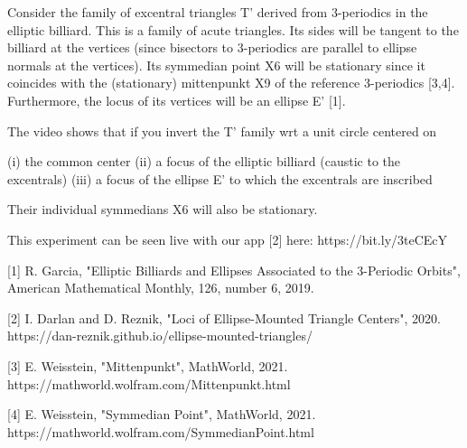 Consider the family of excentral triangles T' derived from 3-periodics in the elliptic billiard. This is a family of acute triangles. Its sides will be tangent to the billiard at the vertices (since bisectors to 3-periodics are parallel to ellipse normals at the vertices). Its symmedian point X6 will be stationary since it coincides with the (stationary) mittenpunkt X9 of the reference 3-periodics [3,4]. Furthermore, the locus of its vertices will be an ellipse E' [1].

The video shows that if you invert the T' family wrt a unit circle centered on

(i) the common center
(ii) a focus of the elliptic billiard (caustic to the excentrals)
(iii) a focus of the ellipse E' to which the excentrals are inscribed

Their individual symmedians X6 will also be stationary.

This experiment can be seen live with our app [2] here: https://bit.ly/3teCEcY

[1] R. Garcia, "Elliptic Billiards and Ellipses Associated to the 3-Periodic Orbits", American Mathematical Monthly, 126, number 6, 2019.

[2] I. Darlan and D. Reznik, "Loci of Ellipse-Mounted Triangle Centers", 2020. https://dan-reznik.github.io/ellipse-mounted-triangles/

[3] E. Weisstein, "Mittenpunkt", MathWorld, 2021. https://mathworld.wolfram.com/Mittenpunkt.html

[4]  E. Weisstein, "Symmedian Point", MathWorld, 2021. https://mathworld.wolfram.com/SymmedianPoint.html